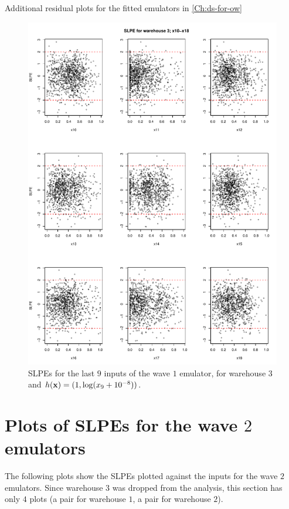 \begin{chapter}{Additional residual plots  for the fitted emulators in \cref{Ch:ds-for-ow} \label{App:resid}}
\begin{figure}
  \centering
  \includegraphics[width=\textwidth]{fig-app-ds/w1-w3-mean2.pdf}
  \caption{SLPEs for the last $9$ inputs of the wave $1$ emulator, for warehouse $3$ and $h(\mathbf{x}) = (1, \log (x_9 + 10^{-8}))$.}
\end{figure}
\newpage
\section{Plots of SLPEs for the wave $2$ emulators \label{App:resid3}}
The following plots show the SLPEs plotted against the inputs for the wave $2$ emulators. Since warehouse $3$ was dropped from  the analysis, this section has only $4$ plots (a pair for warehouse $1$, a pair for warehouse $2$).


\end{chapter}
